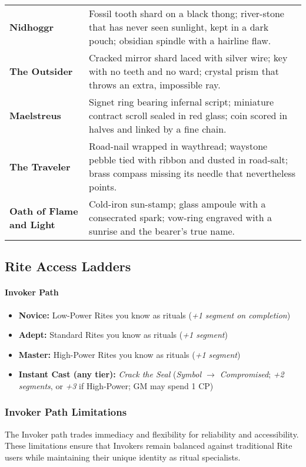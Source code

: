 \documentclass[12pt,twoside]{book}
\begin{document}
\begin{table}[htbp]
\begin{tabular}{>{\bfseries}p{4.0cm} >{\raggedright\arraybackslash}p{10.8cm}}
Nidhoggr & Fossil tooth shard on a black thong; river-stone that has never seen sunlight, kept in a dark pouch; obsidian spindle with a hairline flaw. \\
The Outsider & Cracked mirror shard laced with silver wire; key with no teeth and no ward; crystal prism that throws an extra, impossible ray. \\
Maelstreus & Signet ring bearing infernal script; miniature contract scroll sealed in red glass; coin scored in halves and linked by a fine chain. \\
The Traveler & Road-nail wrapped in waythread; waystone pebble tied with ribbon and dusted in road-salt; brass compass missing its needle that nevertheless points. \\
Oath of Flame and Light & Cold-iron sun-stamp; glass ampoule with a consecrated spark; vow-ring engraved with a sunrise and the bearer's true name. \\
\bottomrule
\end{tabular}
\end{table}
\subsection*{Rite Access Ladders}

\paragraph{Invoker Path}
\begin{itemize}
  \item \textbf{Novice:} Low-Power Rites you know as rituals (\emph{+1 segment on completion})
  \item \textbf{Adept:} Standard Rites you know as rituals (\emph{+1 segment})
  \item \textbf{Master:} High-Power Rites you know as rituals (\emph{+1 segment})
  \item \textbf{Instant Cast (any tier):} \emph{Crack the Seal} (\emph{Symbol $\rightarrow$ Compromised}; \emph{+2 segments}, or \emph{+3} if High-Power; GM may spend 1 CP)
\end{itemize}

\subsubsection{Invoker Path Limitations}

The Invoker path trades immediacy and flexibility for reliability and accessibility. These limitations ensure that Invokers remain balanced against traditional Rite users while maintaining their unique identity as ritual specialists.
\end{document}
